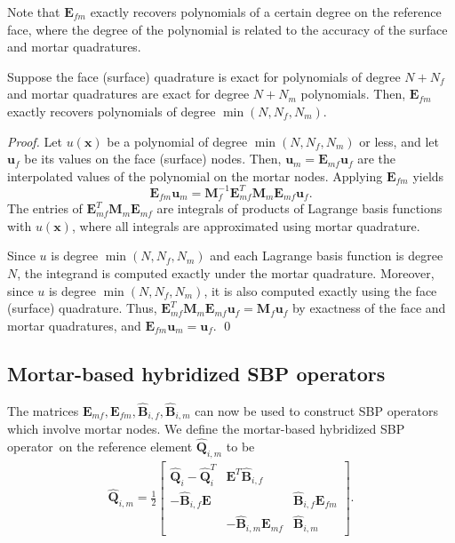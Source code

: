 \documentclass{svjour3}                     %
\renewcommand{\hat}{\widehat}
\begin{document}
Note that $\bm{E}_{fm}$ exactly recovers polynomials of a certain degree on the reference face, where the degree of the polynomial is related to the accuracy of the surface and mortar quadratures.
\begin{lemma}
\label{lemma:Efm}
Suppose the face (surface) quadrature is exact for polynomials of degree $N+N_f$ and mortar quadratures are exact for degree $N+N_m$ polynomials.  Then, $\bm{E}_{fm}$ exactly recovers polynomials of degree $\min(N,N_f,N_m)$.
\end{lemma}
\begin{proof}
Let $u(\bm{x})$ be a polynomial of degree $\min(N,N_f,N_m)$ or less, and let $\bm{u}_f$ be its values on the face (surface) nodes.  Then, $\bm{u}_m = \bm{E}_{mf}\bm{u}_f$ are the interpolated values of the polynomial on the mortar nodes.  Applying $\bm{E}_{fm}$ yields
\[
\bm{E}_{fm}\bm{u}_m = \bm{M}_f^{-1}\bm{E}_{mf}^T\bm{M}_m\bm{E}_{mf}\bm{u}_f.
\]
The entries of $\bm{E}_{mf}^T\bm{M}_m\bm{E}_{mf}$ are integrals of products of Lagrange basis functions with $u(\bm{x})$, where all integrals are approximated using mortar quadrature.  

Since $u$ is degree $\min(N,N_f,N_m)$ and each Lagrange basis function is degree $N$, the integrand is computed exactly under the mortar quadrature.  Moreover, since $u$ is degree $\min(N,N_f,N_m)$, it is also computed exactly using the face (surface) quadrature.  Thus, $\bm{E}_{mf}^T\bm{M}_m\bm{E}_{mf} \bm{u}_f = \bm{M}_f \bm{u}_f$ by exactness of the face and mortar quadratures, and $\bm{E}_{fm}\bm{u}_m = \bm{u}_f$.
\qed\end{proof}

\subsection{Mortar-based hybridized SBP operators}

The matrices $\bm{E}_{mf}, \bm{E}_{fm}, \hat{\bm{B}}_{i,f}, \hat{\bm{B}}_{i,m}$ can now be used to construct SBP operators which involve mortar nodes.  We define the mortar-based hybridized SBP operator on the reference element $\hat{\bm{Q}}_{i,m}$ to be
\begin{align}
\hat{\bm{Q}}_{i,m} = \frac{1}{2}\begin{bmatrix}
\hat{\bm{Q}}_i - \hat{\bm{Q}}_i^T & \bm{E}^T\hat{\bm{B}}_{i,f} & \\
-\hat{\bm{B}}_{i,f}\bm{E} & & \hat{\bm{B}}_{i,f} \bm{E}_{fm}\\
& -\hat{\bm{B}}_{i,m} \bm{E}_{mf} & \hat{\bm{B}}_{i,m}
\end{bmatrix}.
\label{eq:mhsbp}
\end{align}
\end{document}
